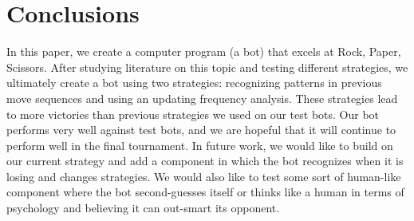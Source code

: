 
\section{Conclusions}
\label{sec:concl}



In this paper, we create a computer program (a bot) that excels at Rock, Paper, Scissors. After studying literature on this topic and testing different strategies, we ultimately create a bot using two strategies: recognizing patterns in previous move sequences and using an updating frequency analysis. These strategies lead to more victories than previous strategies we used on our test bots. Our bot performs very well against test bots, and we are hopeful that it will continue to perform well in the final tournament. In future work, we would like to build on our current strategy and add a component in which the bot recognizes when it is losing and changes strategies. We would also like to test some sort of human-like component where the bot second-guesses itself or thinks like a human in terms of psychology and believing it can out-smart its opponent. 